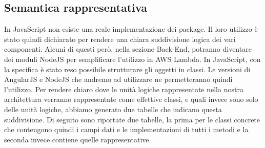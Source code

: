 \documentclass[../DefinizioneDiProdotto.tex]{subfiles}
\begin{document}
	\subsection{Semantica rappresentativa}
	In JavaScript non esiste una reale implementazione dei package. Il loro utilizzo è stato quindi dichiarato per rendere una chiara suddivisione logica dei vari componenti.
	Alcuni di questi però, nella sezione Back-End, potranno diventare dei moduli NodeJS per
	semplificare l'utilizzo in AWS Lambda.
	In JavaScript, con la specifica  è stato reso possibile strutturare gli oggetti
	in classi. Le versioni di AngularJS e NodeJS che andremo ad utilizzare ne permetteranno
	quindi l'utilizzo.
	Per rendere chiaro dove le unità logiche rappresentate nella nostra architettura verranno
	rappresentate come effettive classi, e quali invece sono solo delle unità logiche, abbiamo
	generato due tabelle che indicano questa suddivisione.
	Di seguito sono riportate due tabelle, la prima per le classi concrete che contengono quindi	i campi dati e le implementazioni di tutti i metodi e la seconda invece contiene quelle rappresentative.
\end{document}
